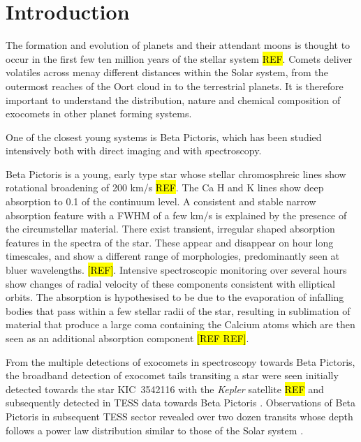 \documentclass{aa}
\begin{document}
\section{Introduction}

The formation and evolution of planets and their attendant moons is thought to occur in the first few ten million years of the stellar system \hl{REF}.
%
Comets deliver volatiles across menay different distances within the Solar system, from the outermost reaches of the Oort cloud in to the terrestrial planets.
%
It is therefore important to understand the distribution, nature and chemical composition of exocomets in other planet forming systems.

One of the closest young systems is Beta Pictoris, which has been studied intensively both with direct imaging and with spectroscopy.

Beta Pictoris is a young, early type star whose stellar chromosphreic lines show rotational broadening of 200 km/s \hl{REF}.
%
The Ca H and K lines show deep absorption to 0.1 of the continuum level.
%
A consistent and stable narrow absorption feature with a FWHM of a few km/s is explained by the presence of the circumstellar material.
%
There exist transient, irregular shaped absorption features in the spectra of the star.
%
These appear and disappear on hour long timescales, and show a different range of morphologies, predominantly seen at bluer wavelengths. \hl{[REF]}.
%
Intensive spectroscopic monitoring over several hours show changes of radial velocity of these components consistent with elliptical orbits.
%
The absorption is hypothesised to be due to the evaporation of infalling bodies that pass within a few stellar radii of the star, resulting in sublimation of material that produce a large coma containing the Calcium atoms which are then seen as an additional absorption component \hl{[REF REF]}.

From the multiple detections of exocomets in spectroscopy towards Beta Pictoris, the broadband detection of exocomet tails transiting a star were seen initially detected towards the star KIC~3542116 \citep{Rappaport18} with the {\it Kepler} satellite \hl{REF} and subsequently detected in TESS data towards Beta Pictoris \citep{Zieba19}.
%
Observations of Beta Pictoris in subsequent TESS sector revealed over two dozen transits whose depth follows a power law distribution similar to those of the Solar system \citep{LecavelierdesEtangs22,Pavlenko22}.



\end{document}
